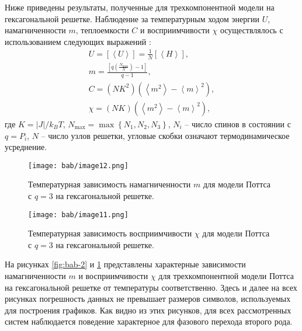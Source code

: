 Ниже приведены результаты, полученные для трехкомпонентной модели на гексагональной решетке.
Наблюдение за температурным ходом энергии $U$, намагниченности $m$, теплоемкости $C$ и восприимчивости $\chi$ осуществлялось с использованием следующих выражений \cite{bib:bab-9, bib:bab-11}:
\begin{gather*}
    U = \left[\left<U\right>\right]=\frac1N\left[\left<H\right>\right], \\
    m = \frac{\left[q\left(\frac{N_{\max}}{N}\right) - 1\right]}{q - 1}, \\
    C = \left(NK^2\right)\left(\left<m^2\right>-\left<m\right>^2\right), \\
    \chi = (NK) \left(\left<m^2\right>-\left<m\right>^2\right),
\end{gather*}
где $K = \left|J\right| / k_B T$, $N_{\max} = \max \left\{N_1, N_2, N_3\right\}$, $N_i$ -- число спинов в состоянии с $q=P_i$, $N$ -- число узлов решетки, угловые скобки означают термодинамическое усреднение.
\begin{figure}[ht]
    \begin{minipage}[c]{0.45\linewidth}
        \texttt{[image: bab/image12.png]}
        \caption{Температурная зависимость намагниченности $m$ для модели Поттса с $q=3$ на гексагональной решетке.}
        \label{fig:bab-2}
    \end{minipage}
    \hfill
    \begin{minipage}[c]{0.45\linewidth}
        \texttt{[image: bab/image11.png]}
        \caption{Температурная зависимость восприимчивости $\chi$ для модели Поттса с $q=3$ на гексагональной решетке.}
        \label{fig:bab-3}
    \end{minipage}
\end{figure}

На рисунках \ref{fig:bab-2} и \ref{fig:bab-3} представлены характерные зависимости намагниченности $m$ и 
восприимчивости $\chi$ для трехкомпонентной модели Поттса на гексагональной решетке от температуры соответственно. Здесь и далее на всех рисунках погрешность данных не превышает размеров символов, используемых для построения графиков. Как видно из этих рисунков, для всех рассмотренных систем наблюдается поведение характерное для фазового перехода второго рода.

